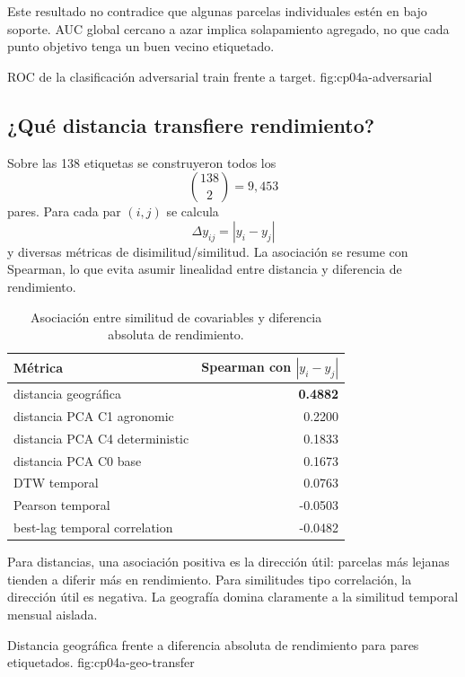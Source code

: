 Este resultado no contradice que algunas parcelas individuales estén en bajo soporte. AUC
global cercano a azar implica solapamiento agregado, no que cada punto objetivo tenga un buen
vecino etiquetado.

{ROC de la clasificación adversarial train frente a target.}
{fig:cp04a-adversarial}

\subsection{¿Qué distancia transfiere rendimiento?}

Sobre las 138 etiquetas se construyeron todos los
\[
{138\choose2}=9{,}453
\]
pares. Para cada par $(i,j)$ se calcula
\[
\Delta y_{ij}=|y_i-y_j|
\]
y diversas métricas de disimilitud/similitud. La asociación se resume con Spearman, lo que
evita asumir linealidad entre distancia y diferencia de rendimiento.

\begin{table}[H]
\centering
\caption{Asociación entre similitud de covariables y diferencia absoluta de rendimiento.}
\label{tab:cp04a-transfer}
\begin{tabular}{lr}
\toprule
Métrica & Spearman con $|y_i-y_j|$ \\
\midrule
distancia geográfica & \textbf{0.4882} \\
distancia PCA C1 agronomic & 0.2200 \\
distancia PCA C4 deterministic & 0.1833 \\
distancia PCA C0 base & 0.1673 \\
DTW temporal & 0.0763 \\
Pearson temporal & -0.0503 \\
best-lag temporal correlation & -0.0482 \\
\bottomrule
\end{tabular}
\end{table}

Para distancias, una asociación positiva es la dirección útil: parcelas más lejanas tienden a
diferir más en rendimiento. Para similitudes tipo correlación, la dirección útil es negativa.
La geografía domina claramente a la similitud temporal mensual aislada.

{Distancia geográfica frente a diferencia absoluta de rendimiento para pares etiquetados.}
{fig:cp04a-geo-transfer}

